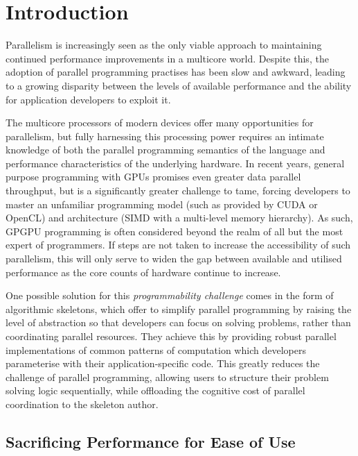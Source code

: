 \documentclass[prodmode,acmtecs]{acmsmall} %
\begin{document}
\maketitle



\section{Introduction}\label{sec:introduction}

Parallelism is increasingly seen as the only viable approach to
maintaining continued performance improvements in a multicore world.
Despite this, the adoption of parallel programming practises has been
slow and awkward, leading to a growing disparity between the levels of
available performance and the ability for application developers to
exploit it.

The multicore processors of modern devices offer many opportunities
for parallelism, but fully harnessing this processing power requires
an intimate knowledge of both the parallel programming semantics of
the language and performance characteristics of the underlying
hardware. In recent years, general purpose programming with GPUs
promises even greater data parallel throughput, but is a significantly
greater challenge to tame, forcing developers to master an unfamiliar
programming model (such as provided by CUDA or OpenCL) and
architecture (SIMD with a multi-level memory hierarchy). As such,
GPGPU programming is often considered beyond the realm of all but the
most expert of programmers. If steps are not taken to increase the
accessibility of such parallelism, this will only serve to widen the
gap between available and utilised performance as the core counts of
hardware continue to increase.

One possible solution for this \emph{programmability challenge} comes
in the form of algorithmic skeletons, which offer to simplify parallel
programming by raising the level of abstraction so that developers can
focus on solving problems, rather than coordinating parallel
resources. They achieve this by providing robust parallel
implementations of common patterns of computation which developers
parameterise with their application-specific code. This greatly
reduces the challenge of parallel programming, allowing users to
structure their problem solving logic sequentially, while offloading
the cognitive cost of parallel coordination to the skeleton author.


\subsection{Sacrificing Performance for Ease of Use}
\end{document}
